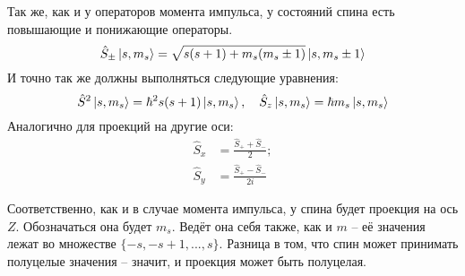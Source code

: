 Так же, как и у операторов момента импульса, у состояний спина есть повышающие и понижающие операторы.
\[
\hat{S}_{\pm}\ket{s, m_s} = \sqrt{s(s+1) + m_s(m_s \pm 1)}\ket{s, m_s \pm 1}
\]
И точно так же должны выполняться следующие уравнения:
\[
\hat{S}^2\ket{s,m_s} = \hbar^2 s(s+ 1)\ket{s,m_s}, \quad \hat{S}_z\ket{s,m_s} = \hbar m_s\ket{s,m_s}
\]
Аналогично для проекций на другие оси:
\begin{align*}
    \hat{S}_x & = \frac{\hat{S}_+ + \hat{S}_-}{2};\\
    \hat{S}_y & = \frac{\hat{S}_+ - \hat{S}_-}{2i}
\end{align*}

Соответственно, как и в случае момента импульса, у спина будет проекция на ось $Z$. Обозначаться она будет $m_s$. Ведёт она себя также, как и $m$ -- её значения лежат во множестве $\{-s, -s + 1, ..., s\}$. Разница в том, что спин может принимать полуцелые значения -- значит, и проекция может быть полуцелая.

